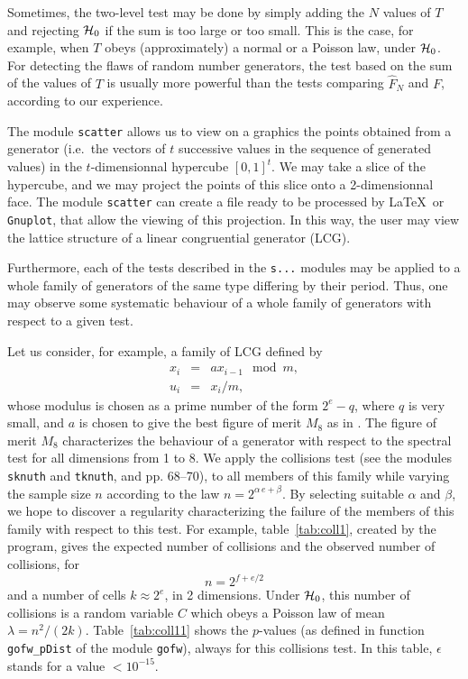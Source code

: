 Sometimes, the two-level test may be done by simply adding
the $N$ values of $T$
and rejecting $\mathcal{H}_0$ if the sum is too large or too small.
This is the case, for example, when $T$ obeys (approximately) a normal 
or a Poisson law, under $\mathcal{H}_0$.
For detecting the flaws of random number
generators, the test based on the sum of the  values of $T$ is usually more
powerful than the tests comparing $\hat F_N$ and $F$,
according to our experience.

The module {\tt scatter} allows us to view on a graphics the points
obtained from a generator (i.e.\ the vectors of $t$ 
successive values in the sequence of generated values)
in the $t$-dimensionnal hypercube $[0,1]^t$.
We may take a slice of the hypercube, and we may
project the points of this slice onto a 2-dimensionnal face.
The module {\tt scatter} can create a file ready to be processed by
 \LaTeX\ or {\tt Gnuplot}, that allow the viewing of this projection.
In this way, the user may view the lattice structure of a linear
congruential generator (LCG).

Furthermore, each of the tests described in the  {\tt s...} modules may
be applied to a whole family of generators of the same
 type differing by their period. Thus, one may observe some
 systematic behaviour of a whole family of generators with respect to a
given test.

Let us consider, for example, a family of  {LCG} defined by
\begin{eqnarray*}
   x_i &=& a x_{i-1} \mod m,\\
   u_i &=& x_i / m,         
\end{eqnarray*}
whose modulus is chosen as a prime number
of the form $2^e - q$, where $q$ is very small, and 
$a$ is chosen to give the best figure of  merit $M_8$ as in
 \cite{rLEC99c}. The  figure of merit 
 $M_8$ characterizes the behaviour of a generator
with respect to the  spectral test for all dimensions from 1 to 8.
We apply the  collisions test (see the modules
{\tt sknuth} and {\tt tknuth}, and \cite{rKNU81a} pp. 68--70), 
to all members of this 
 family while varying the sample size $n$ according to the law
 $n=2^{\alpha\, e + \beta}$. By selecting suitable
 $\alpha$ and  $\beta$, we  hope to discover a
 regularity characterizing the failure of the 
members of this family with respect to this test.
For example, table~\ref{tab:coll1},  created by the program,
gives the  expected number of collisions and the
 observed number of collisions, for 
$$
  n = 2^{f + e/2}
$$
and a number of cells $k\approx 2^e$, in 2 dimensions.
Under $\mathcal{H}_0$, this number of collisions is a random variable $C$ which
obeys a  Poisson law of mean $\lambda = n^2/(2k)$.
Table~\ref{tab:coll11} shows the $p$-values (as defined in
function {\tt gofw\_pDist} of the module {\tt gofw}), always for this
collisions test.
In this table, $\epsilon$ stands for a value $< 10^{-15}$.


